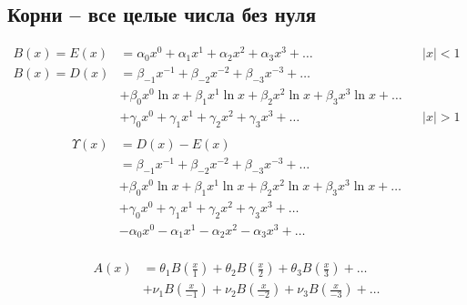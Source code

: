 
\subsection{Корни -- все целые числа без нуля}

\begin{equation*} \begin{aligned}
B(x) = E(x) &=
  \alpha_0 x^0
+ \alpha_1 x^1
+ \alpha_2 x^2
+ \alpha_3 x^3
+ \ldots &
&|x| < 1 \\
%
B(x) = D(x) &=   
  \beta_{-1} x^{-1}
+ \beta_{-2} x^{-2}
+ \beta_{-3} x^{-3}
+ \ldots \\ &
+ \beta_0 x^0 \ln{x}
+ \beta_1 x^1 \ln{x}
+ \beta_2 x^2 \ln{x}
+ \beta_3 x^3 \ln{x}
+ \ldots \\ &
+ \gamma_0 x^0
+ \gamma_1 x^1
+ \gamma_2 x^2
+ \gamma_3 x^3
+ \ldots &
&|x| > 1 \\
\end{aligned} \end{equation*}
%
\begin{equation*} \begin{aligned}
\Upsilon(x) &= D(x) - E(x) \\ &=
  \beta_{-1} x^{-1}
+ \beta_{-2} x^{-2}
+ \beta_{-3} x^{-3}
+ \ldots \\ &
+ \beta_0 x^0 \ln{x}
+ \beta_1 x^1 \ln{x}
+ \beta_2 x^2 \ln{x}
+ \beta_3 x^3 \ln{x}
+ \ldots \\ &
+ \gamma_0 x^0
+ \gamma_1 x^1
+ \gamma_2 x^2
+ \gamma_3 x^3
+ \ldots \\ &
- \alpha_0 x^0
- \alpha_1 x^1
- \alpha_2 x^2
- \alpha_3 x^3
+ \ldots \\
\end{aligned} \end{equation*}

\begin{equation*} \begin{aligned}
A(x) &=
  \theta_1 B{\left(\frac{x}{1} \right)}
+ \theta_2 B{\left(\frac{x}{2} \right)}
+ \theta_3 B{\left(\frac{x}{3} \right)}
+ \ldots \\ &
+ \nu_1 B{\left(\frac{x}{- 1} \right)}
+ \nu_2 B{\left(\frac{x}{- 2} \right)}
+ \nu_3 B{\left(\frac{x}{- 3} \right)}
+ \ldots \\
\end{aligned} \end{equation*}

